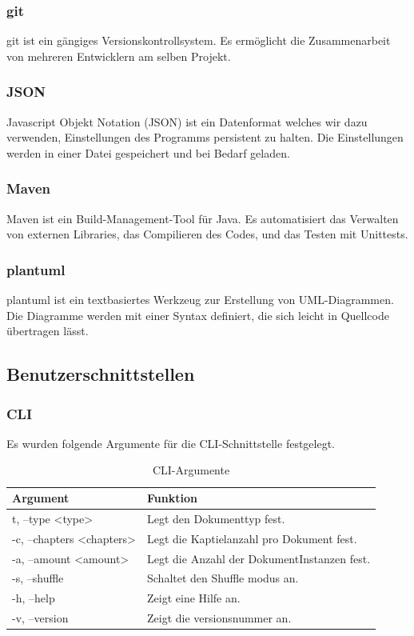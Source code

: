 \documentclass[stu, a4paper, 11pt, floatsintext]{apa7}
\begin{document}
\subsubsection{git}
\noindent git ist ein gängiges Versionskontrollsystem.
Es ermöglicht die Zusammenarbeit von mehreren Entwicklern am selben Projekt.

\subsubsection{JSON}
\noindent Javascript Objekt Notation (JSON) ist ein Datenformat welches wir dazu verwenden,
Einstellungen des Programms persistent zu halten.
Die Einstellungen werden in einer Datei gespeichert und bei Bedarf geladen.

\subsubsection{Maven}
\noindent Maven ist ein Build-Management-Tool für Java.
Es automatisiert das Verwalten von externen Libraries, das Compilieren des Codes,
und das Testen mit Unittests.

\subsubsection{plantuml}
\noindent plantuml ist ein textbasiertes Werkzeug zur Erstellung von UML-Diagrammen.
Die Diagramme werden mit einer Syntax definiert, die sich leicht in Quellcode übertragen lässt.

\subsection{Benutzerschnittstellen}

\subsubsection{CLI}
\noindent Es wurden folgende Argumente für die CLI-Schnittstelle festgelegt.

\begin{table}[htpb]
\centering
\caption{\label{argumente}CLI-Argumente}
\begin{tabular}{ll}
\toprule
Argument & Funktion \\
\midrule
\-t, --type <type> & Legt den Dokumenttyp fest.\\
-c, --chapters <chapters> & Legt die Kaptielanzahl pro Dokument fest.\\
-a, --amount <amount> & Legt die Anzahl der DokumentInstanzen fest.\\
-s, --shuffle & Schaltet den Shuffle modus an.\\
-h, --help & Zeigt eine Hilfe an.\\
-v, --version & Zeigt die versionsnummer an.\\
\bottomrule
\end{tabular}
\end{table}
\end{document}
